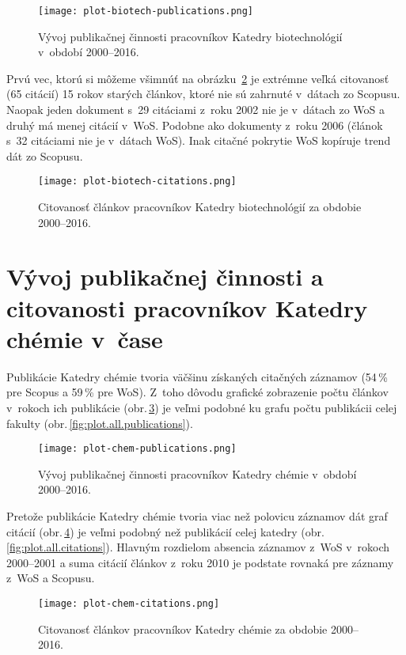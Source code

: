 \begin{figure}
  \centering
  \texttt{[image: plot-biotech-publications.png]}
  \caption{Vývoj publikačnej činnosti pracovníkov Katedry biotechnológií
    v~období 2000--2016.}
  \label{fig:plot.biotech.publications}
\end{figure}

Prvú vec, ktorú si môžeme všimnúť na obrázku~\ref{fig:plot.biotech.citations} je
extrémne veľká citovanosť (65 citácií) 15 rokov starých článkov, ktoré nie sú
zahrnuté v~dátach zo Scopusu.  Naopak jeden dokument s~29 citáciami z~roku 2002
nie je v~dátach zo WoS a druhý má menej citácií v~WoS.  Podobne ako dokumenty
z~roku 2006 (článok s~32 citáciami nie je v~dátach WoS).  Inak citačné pokrytie
WoS kopíruje trend dát zo Scopusu.

\begin{figure}
  \centering
  \texttt{[image: plot-biotech-citations.png]}
  \caption{Citovanosť článkov pracovníkov Katedry biotechnológií za obdobie
    2000--2016.}
  \label{fig:plot.biotech.citations}
\end{figure}


\section{Vývoj publikačnej činnosti a citovanosti pracovníkov Katedry chémie
  v~čase}

Publikácie Katedry chémie tvoria väčšinu získaných citačných záznamov (54\,\%
pre Scopus a 59\,\% pre WoS).  Z~toho dôvodu grafické zobrazenie počtu článkov
v~rokoch ich publikácie (obr.\,\ref{fig:plot.chem.publications}) je veľmi
podobné ku grafu počtu publikácii celej fakulty
(obr.\,\ref{fig:plot.all.publications}).

\begin{figure}
  \centering
  \texttt{[image: plot-chem-publications.png]}
  \caption{Vývoj publikačnej činnosti pracovníkov Katedry chémie v~období
    2000--2016.}
  \label{fig:plot.chem.publications}
\end{figure}

Pretože publikácie Katedry chémie tvoria viac než polovicu záznamov dát graf
citácií (obr.\,\ref{fig:plot.chem.citations}) je veľmi podobný než publikácií
celej katedry (obr.\,\ref{fig:plot.all.citations}).  Hlavným rozdielom absencia
záznamov z~WoS v~rokoch 2000--2001 a suma citácií článkov z~roku 2010 je
podstate rovnaká pre záznamy z~WoS a Scopusu.

\begin{figure}
  \centering
  \texttt{[image: plot-chem-citations.png]}
  \caption{Citovanosť článkov pracovníkov Katedry chémie za obdobie 2000--2016.}
  \label{fig:plot.chem.citations}
\end{figure}


